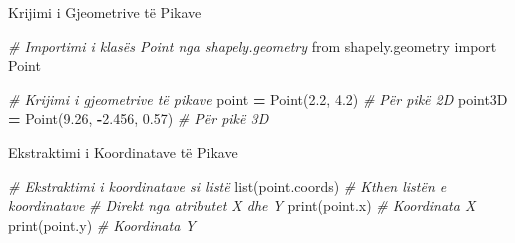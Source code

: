 \documentclass[
  ignorenonframetext,
]{beamer}
\newenvironment{Shaded}{\begin{snugshade}}{\end{snugshade}}
\newcommand{\BuiltInTok}[1]{#1}
\newcommand{\CommentTok}[1]{\textcolor[rgb]{0.56,0.35,0.01}{\textit{#1}}}
\newcommand{\FloatTok}[1]{\textcolor[rgb]{0.00,0.00,0.81}{#1}}
\newcommand{\ImportTok}[1]{#1}
\newcommand{\NormalTok}[1]{#1}
\newcommand{\OperatorTok}[1]{\textcolor[rgb]{0.81,0.36,0.00}{\textbf{#1}}}
\begin{document}
\begin{frame}[fragile]{Krijimi i Gjeometrive të Pikave}
\protect\hypertarget{krijimi-i-gjeometrive-tuxeb-pikave-1}{}

\begin{Shaded}
\begin{Highlighting}[]
\CommentTok{\# Importimi i klasës Point nga shapely.geometry}
\ImportTok{from}\NormalTok{ shapely.geometry }\ImportTok{import}\NormalTok{ Point}

\CommentTok{\# Krijimi i gjeometrive të pikave}
\NormalTok{point }\OperatorTok{=}\NormalTok{ Point(}\FloatTok{2.2}\NormalTok{, }\FloatTok{4.2}\NormalTok{)  }\CommentTok{\# Për pikë 2D}
\NormalTok{point3D }\OperatorTok{=}\NormalTok{ Point(}\FloatTok{9.26}\NormalTok{, }\OperatorTok{{-}}\FloatTok{2.456}\NormalTok{, }\FloatTok{0.57}\NormalTok{)  }\CommentTok{\# Për pikë 3D}
\end{Highlighting}
\end{Shaded}
\end{frame}

\begin{frame}[fragile]{Ekstraktimi i Koordinatave të Pikave}
\protect\hypertarget{ekstraktimi-i-koordinatave-tuxeb-pikave}{}

\begin{Shaded}
\begin{Highlighting}[]
\CommentTok{\# Ekstraktimi i koordinatave si listë}
\BuiltInTok{list}\NormalTok{(point.coords)  }\CommentTok{\# Kthen listën e koordinatave}
\CommentTok{\# Direkt nga atributet X dhe Y}
\BuiltInTok{print}\NormalTok{(point.x)  }\CommentTok{\# Koordinata X}
\BuiltInTok{print}\NormalTok{(point.y)  }\CommentTok{\# Koordinata Y}
\end{Highlighting}
\end{Shaded}
\end{frame}
\end{document}
